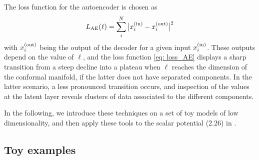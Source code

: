 \documentclass[11pt]{article}
\begin{document}
%
The loss function for the autoencoder is chosen as
%
\begin{equation}	\label{eq: loss_AE}
	L_{\rm AE}(\ell)=\sum_i^N\big\vert x_i^{\rm (in)}-x_i^{\rm (out)}\big\vert^2
\end{equation}
%
with $x_i^{\rm (out)}$ being the output of the decoder for a given input $x_i^{\rm (in)}$.
These outputs depend on the value of $\ell$, and the loss function \eqref{eq: loss_AE} displays
a sharp transition from a steep decline into a plateau when $\ell$ reaches the dimension of the 
conformal manifold, if the latter does not have separated components. 
In the latter scenario, a less pronounced transition occurs, and inspection of the values at 
the latent layer reveals clusters of data associated to the different components.

In the following, we introduce these techniques on a set of toy models of low dimensionality, and then apply these
tools to the scalar potential (2.26) in \cite{Eloy:2021fhc}.


\subsection{Toy examples}


\end{document}
